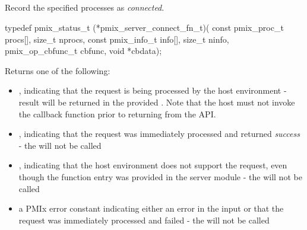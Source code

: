 \subsection{}

\summary

Record the specified processes as \textit{connected}.

\format

\cspecificstart
\begin{codepar}
typedef pmix_status_t (*pmix_server_connect_fn_t)(
                             const pmix_proc_t procs[],
                             size_t nprocs,
                             const pmix_info_t info[],
                             size_t ninfo,
                             pmix_op_cbfunc_t cbfunc,
                             void *cbdata);
\end{codepar}
\cspecificend

\begin{arglist}
\end{arglist}

Returns one of the following:

\begin{itemize}
    \item {}, indicating that the request is being processed by the host environment - result will be returned in the provided . Note that the host must not invoke the callback function prior to returning from the \ac{API}.
    \item {}, indicating that the request was immediately processed and returned \textit{success} - the  will not be called
    \item {}, indicating that the host environment does not support the request, even though the function entry was provided in the server module - the  will not be called
    \item a PMIx error constant indicating either an error in the input or that the request was immediately processed and failed - the  will not be called
\end{itemize}

